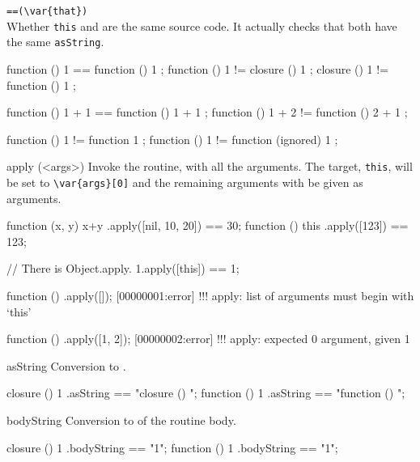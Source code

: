 \begin{urbiscriptapi}
\item \lstinline|==(\var{that})|\\
  Whether \lstinline|this| and  are the same source code.
  It actually checks that both have the same \lstinline|asString|.
\begin{urbiassert}
function () { 1 } == function () { 1 };
function () { 1 } != closure  () { 1 };
closure  () { 1 } != function () { 1 };

function () { 1 + 1 } == function () { 1 + 1 };
function () { 1 + 2 } != function () { 2 + 1 };

function () { 1 } != function { 1 };
function () { 1 } != function (ignored) { 1 };
\end{urbiassert}

\item[apply](<args>)%
  Invoke the routine, with all the arguments.  The target,
  \lstinline|this|, will be set to \lstinline|\var{args}[0]| and the
  remaining arguments with be given as arguments.
\begin{urbiassert}
function (x, y) { x+y }.apply([nil, 10, 20]) == 30;
function () { this }.apply([123]) == 123;

// There is Object.apply.
1.apply([this]) == 1;
\end{urbiassert}
\begin{urbiscript}
function () {}.apply([]);
[00000001:error] !!! apply: list of arguments must begin with `this'

function () {}.apply([1, 2]);
[00000002:error] !!! apply: expected 0 argument, given 1
\end{urbiscript}

\item[asString]
  Conversion to .
\begin{urbiassert}
closure  () { 1 }.asString == "closure () {\n}";
function () { 1 }.asString == "function () {\n}";
\end{urbiassert}

\item[bodyString]
  Conversion to  of the routine body.
\begin{urbiassert}
closure  () { 1 }.bodyString == "1";
function () { 1 }.bodyString == "1";
\end{urbiassert}

\end{urbiscriptapi}


